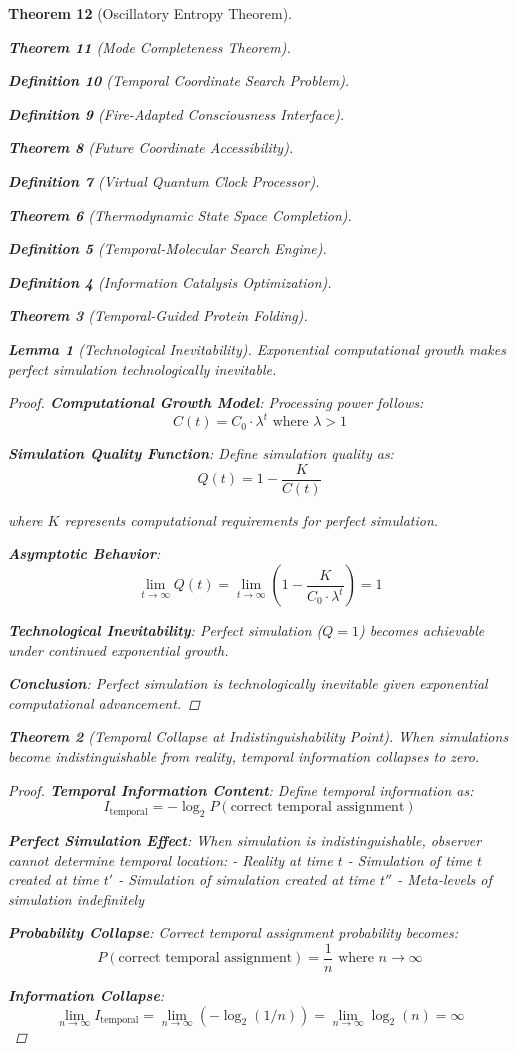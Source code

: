 \documentclass[12pt,a4paper]{article}
\newtheorem{theorem}{Theorem}[section]
\newtheorem{lemma}[theorem]{Lemma}
\newtheorem{definition}[theorem]{Definition}
\begin{document}
\begin{theorem}[Oscillatory Entropy Theorem]
\begin{theorem}[Mode Completeness Theorem]
\begin{enumerate}
\begin{definition}[Temporal Coordinate Search Problem]
\begin{algorithm}
\begin{definition}[Fire-Adapted Consciousness Interface]
\begin{theorem}[Future Coordinate Accessibility]
\begin{definition}[Virtual Quantum Clock Processor]
\begin{itemize}
\begin{itemize}
\begin{theorem}[Thermodynamic State Space Completion]
\begin{definition}[Temporal-Molecular Search Engine]
\begin{definition}[Information Catalysis Optimization]
\begin{algorithm}
\begin{theorem}[Temporal-Guided Protein Folding]
\begin{table}[h]
\begin{lemma}[Technological Inevitability]
Exponential computational growth makes perfect simulation technologically inevitable.
\end{lemma}

\begin{proof}
\textbf{Computational Growth Model}: Processing power follows:
$$C(t) = C_0 \cdot \lambda^t \text{ where } \lambda > 1$$

\textbf{Simulation Quality Function}: Define simulation quality as:
$$Q(t) = 1 - \frac{K}{C(t)}$$

where $K$ represents computational requirements for perfect simulation.

\textbf{Asymptotic Behavior}:
$$\lim_{t \to \infty} Q(t) = \lim_{t \to \infty} \left(1 - \frac{K}{C_0 \cdot \lambda^t}\right) = 1$$

\textbf{Technological Inevitability}: Perfect simulation ($Q = 1$) becomes achievable under continued exponential growth.

\textbf{Conclusion}: Perfect simulation is technologically inevitable given exponential computational advancement.
\end{proof}

\begin{theorem}[Temporal Collapse at Indistinguishability Point]
When simulations become indistinguishable from reality, temporal information collapses to zero.
\end{theorem}

\begin{proof}
\textbf{Temporal Information Content}: Define temporal information as:
$$I_{\text{temporal}} = -\log_2 P(\text{correct temporal assignment})$$

\textbf{Perfect Simulation Effect}: When simulation is indistinguishable, observer cannot determine temporal location:
- Reality at time $t$
- Simulation of time $t$ created at time $t'$
- Simulation of simulation created at time $t''$
- Meta-levels of simulation indefinitely

\textbf{Probability Collapse}: Correct temporal assignment probability becomes:
$$P(\text{correct temporal assignment}) = \frac{1}{n} \text{ where } n \to \infty$$

\textbf{Information Collapse}:
$$\lim_{n \to \infty} I_{\text{temporal}} = \lim_{n \to \infty} (-\log_2(1/n)) = \lim_{n \to \infty} \log_2(n) = \infty$$


\end{proof}
\end{table}
\end{theorem}
\end{algorithm}
\end{definition}
\end{definition}
\end{theorem}
\end{itemize}
\end{itemize}
\end{definition}
\end{theorem}
\end{definition}
\end{algorithm}
\end{definition}
\end{enumerate}
\end{theorem}
\end{theorem}
\end{document}
